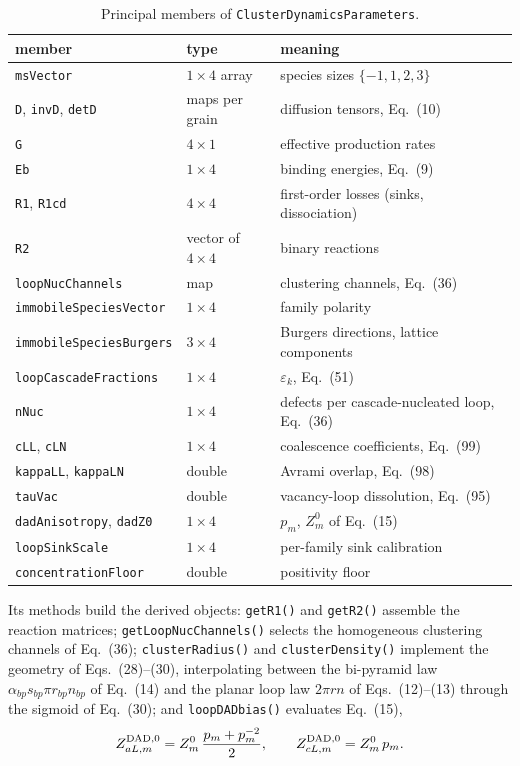 \documentclass[11pt]{article}
\newcommand{\code}[1]{\texttt{\small #1}}
\newcommand{\dref}[1]{Eq.~(#1)}
\newcommand{\drefs}[2]{Eqs.~(#1)--(#2)}
\begin{document}
\begin{table}[htbp]
\centering
\caption{Principal members of \code{ClusterDynamicsParameters}.}
\label{tab:cdp}
\begin{tabular}{@{}lll@{}}
\toprule
member & type & meaning \\
\midrule
\code{msVector} & $1\times4$ array & species sizes $\{-1,1,2,3\}$ \\
\code{D}, \code{invD}, \code{detD} & maps per grain & diffusion tensors, \dref{10} \\
\code{G} & $4\times1$ & effective production rates \\
\code{Eb} & $1\times4$ & binding energies, \dref{9} \\
\code{R1}, \code{R1cd} & $4\times4$ & first-order losses (sinks, dissociation) \\
\code{R2} & vector of $4\times4$ & binary reactions \\
\code{loopNucChannels} & map & clustering channels, \dref{36} \\
\code{immobileSpeciesVector} & $1\times4$ & family polarity \\
\code{immobileSpeciesBurgers} & $3\times4$ & Burgers directions, lattice components \\
\code{loopCascadeFractions} & $1\times4$ & $\varepsilon_k$, \dref{51} \\
\code{nNuc} & $1\times4$ & defects per cascade-nucleated loop, \dref{36} \\
\code{cLL}, \code{cLN} & $1\times4$ & coalescence coefficients, \dref{99} \\
\code{kappaLL}, \code{kappaLN} & double & Avrami overlap, \dref{98} \\
\code{tauVac} & double & vacancy-loop dissolution, \dref{95} \\
\code{dadAnisotropy}, \code{dadZ0} & $1\times4$ & $p_m$, $Z^0_m$ of \dref{15} \\
\code{loopSinkScale} & $1\times4$ & per-family sink calibration \\
\code{concentrationFloor} & double & positivity floor \\
\bottomrule
\end{tabular}
\end{table}

\noindent
Its methods build the derived objects: \code{getR1()} and \code{getR2()} assemble
the reaction matrices; \code{getLoopNucChannels()} selects the homogeneous
clustering channels of \dref{36}; \code{clusterRadius()} and
\code{clusterDensity()} implement the geometry of \drefs{28}{30}, interpolating
between the bi-pyramid law $\alpha_{bp}s_{bp}\pi r_{bp}n_{bp}$ of \dref{14} and
the planar loop law $2\pi r n$ of \drefs{12}{13} through the sigmoid of
\dref{30}; and \code{loopDADbias()} evaluates \dref{15},
\begin{equation}
Z^{\rm DAD,0}_{aL,m} = Z^{0}_{m}\,\frac{p_m + p_m^{-2}}{2},
\qquad
Z^{\rm DAD,0}_{cL,m} = Z^{0}_{m}\,p_m .
\label{eq:dad}
\end{equation}
\end{document}
